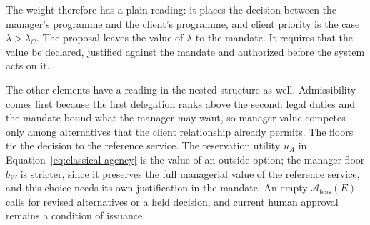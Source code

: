 \documentclass[oneside,10pt,english]{swissi}
\begin{document}
The weight therefore has a plain reading: it places the decision between the manager's programme and the client's programme, and client priority is the case $\lambda>\lambda_C$. The proposal leaves the value of $\lambda$ to the mandate. It requires that the value be declared, justified against the mandate and authorized before the system acts on it.

The other elements have a reading in the nested structure as well. Admissibility comes first because the first delegation ranks above the second: legal duties and the mandate bound what the manager may want, so manager value competes only among alternatives that the client relationship already permits. The floors tie the decision to the reference service. The reservation utility $\bar u_A$ in Equation~\eqref{eq:classical-agency} is the value of an outside option; the manager floor $b_W$ is stricter, since it preserves the full managerial value of the reference service, and this choice needs its own justification in the mandate. An empty $\mathcal A_{\mathrm{feas}}(E)$ calls for revised alternatives or a held decision, and current human approval remains a condition of issuance.
\end{document}
